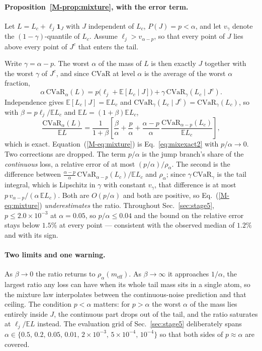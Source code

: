 \documentclass[aps,pra,onecolumn,notitlepage,superscriptaddress,nofootinbib,floatfix]{revtex4-2}
\newcommand{\cvar}{\mathrm{CVaR}}
\newcommand{\E}{\mathbb{E}}
\begin{document}
\paragraph*{Proposition~\ref{M-prop:mixture}, with the error term.} Let
$L=L_c+\ell_j\mathbf 1_J$ with $J$ independent of $L_c$, $P(J)=p<\alpha$, and
let $v_\gamma$ denote the $(1-\gamma)$-quantile of $L_c$. Assume
$\ell_j>v_{\alpha-p}$, so that every point of $J$ lies above every point of
$J^c$ that enters the tail.

Write $\gamma=\alpha-p$. The worst $\alpha$ of the mass of $L$ is then exactly
$J$ together with the worst $\gamma$ of $J^c$, and since $\cvar$ at level
$\alpha$ is the average of the worst $\alpha$ fraction,
\begin{equation}
\alpha\,\cvar_\alpha(L)=p\big(\ell_j+\E[L_c\mid J]\big)
+\gamma\,\cvar_{\gamma}(L_c\mid J^c).
\label{eq:mixexact}
\end{equation}
Independence gives $\E[L_c\mid J]=\E L_c$ and
$\cvar_\gamma(L_c\mid J^c)=\cvar_\gamma(L_c)$, so with
$\beta=p\ell_j/\E L_c$ and $\E L=(1+\beta)\E L_c$,
\begin{equation}
\frac{\cvar_\alpha(L)}{\E L}
=\frac{1}{1+\beta}\left[\frac{\beta}{\alpha}+\frac{p}{\alpha}
+\frac{\alpha-p}{\alpha}\,\frac{\cvar_{\alpha-p}(L_c)}{\E L_c}\right],
\label{eq:mixexact2}
\end{equation}
which is exact. Equation~(\ref{M-eq:mixture}) is Eq.~\eqref{eq:mixexact2} with
$p/\alpha\to0$. Two corrections are dropped. The term $p/\alpha$ is the jump
branch's share of the \emph{continuous} loss, a relative error of at most
$(p/\alpha)/\rho_\alpha$. The second is the difference between
$\frac{\alpha-p}{\alpha}\,\cvar_{\alpha-p}(L_c)/\E L_c$ and $\rho_\alpha$;
since $\gamma\,\cvar_\gamma$ is the tail integral, which is Lipschitz in
$\gamma$ with constant $v_\gamma$, that difference is at most
$p\,v_{\alpha-p}/(\alpha\,\E L_c)$. Both are $O(p/\alpha)$ and both are
positive, so Eq.~(\ref{M-eq:mixture}) \emph{underestimates} the ratio.
Throughout Sec.~\ref{sec:stage5}, $p\le2.0\times10^{-3}$ at $\alpha=0.05$, so
$p/\alpha\le0.04$ and the bound on the relative error stays below $1.5\%$ at
every point --- consistent with the observed median of $1.2\%$ and with its
sign.

\paragraph*{Two limits and one warning.} As $\beta\to0$ the ratio returns to
$\rho_\alpha(m_{\mathrm{eff}})$. As $\beta\to\infty$ it approaches $1/\alpha$,
the largest ratio any loss can have when its whole tail mass sits in a single
atom, so the mixture law interpolates between the continuous-noise prediction
and that ceiling. The condition $p<\alpha$ matters: for $p>\alpha$ the worst
$\alpha$ of the mass lies entirely inside $J$, the continuous part drops out
of the tail, and the ratio saturates at $\ell_j/\E L$ instead. The evaluation
grid of Sec.~\ref{sec:stage5} deliberately spans
$\alpha\in\{0.5,\,0.2,\,0.05,\,0.01,\,2\times10^{-3},\,5\times10^{-4},\,
10^{-4}\}$ so that both sides of $p\approx\alpha$ are covered.
\end{document}
